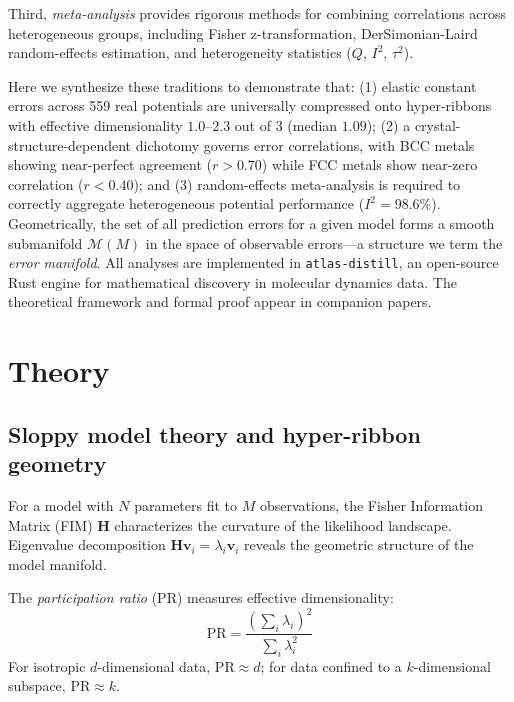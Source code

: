 \documentclass[twocolumn,9pt]{extarticle}
\begin{document}
Third, \textit{meta-analysis} provides rigorous methods for combining correlations across heterogeneous groups, including Fisher z-transformation, DerSimonian-Laird random-effects estimation, and heterogeneity statistics ($Q$, $I^2$, $\tau^2$)\cite{hedges1985,borenstein2009,borenstein2010,dersimonian1986,higgins2003}.

Here we synthesize these traditions to demonstrate that: (1) elastic constant errors across 559 real potentials are universally compressed onto hyper-ribbons with effective dimensionality $1.0$--$2.3$ out of 3 (median $1.09$); (2) a crystal-structure-dependent dichotomy governs error correlations, with BCC metals showing near-perfect agreement ($r>0.70$) while FCC metals show near-zero correlation ($r<0.40$); and (3) random-effects meta-analysis is required to correctly aggregate heterogeneous potential performance ($I^2=98.6\%$). Geometrically, the set of all prediction errors for a given model forms a smooth submanifold $\mathcal{M}(M)$ in the space of observable errors---a structure we term the \textit{error manifold}. All analyses are implemented in \texttt{atlas-distill}, an open-source Rust engine for mathematical discovery in molecular dynamics data. The theoretical framework and formal proof appear in companion papers\cite{welcing2026universality,welcing2026formal}.

\section{Theory}

\subsection{Sloppy model theory and hyper-ribbon geometry}

For a model with $N$ parameters fit to $M$ observations, the Fisher Information Matrix (FIM) $\mathbf{H}$ characterizes the curvature of the likelihood landscape. Eigenvalue decomposition $\mathbf{H}\mathbf{v}_i = \lambda_i \mathbf{v}_i$ reveals the geometric structure of the model manifold.

The \textit{participation ratio} (PR) measures effective dimensionality:
\begin{equation}
\text{PR} = \frac{(\sum_i \lambda_i)^2}{\sum_i \lambda_i^2}
\end{equation}
For isotropic $d$-dimensional data, $\text{PR} \approx d$; for data confined to a $k$-dimensional subspace, $\text{PR} \approx k$.
\end{document}
